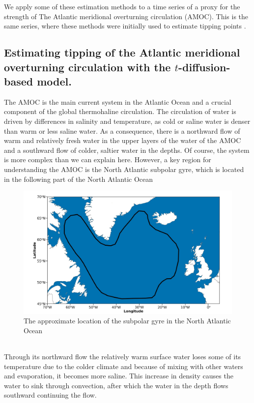 We apply some of these estimation methods to a time series of a proxy for the strength of The Atlantic meridional overturning circulation (AMOC). This is the same series,  where these methods were initially used to estimate tipping points \cite{Ditlevsen2023}.
\subsection{Estimating tipping of the Atlantic meridional overturning circulation with the \texorpdfstring{$t$}{t}-diffusion-based model.}
The AMOC is the main current system in the Atlantic Ocean and a crucial component of the global thermohaline circulation. The circulation of water is driven by differences in salinity and temperature, as cold or saline water is denser than warm or less saline water. As a consequence, there is a northward flow of warm and relatively fresh water in the upper layers of the water of the AMOC and a southward flow of colder, saltier water in the depths. Of course, the system is more complex than we can explain here. However, a key region for understanding the AMOC is the North Atlantic subpolar gyre, which is located in the following part of the North Atlantic Ocean
\begin{figure}[h!]
    \begin{center}
        \includegraphics[scale = .175]{figures/NorthAtlanticOcean.jpeg}
    \end{center}
    \caption{The approximate location of the subpolar gyre in the North Atlantic Ocean}
    \label{figure:subpolarGyre}
\end{figure}\\
Through its northward flow the relatively warm surface water loses some of its temperature due to the colder climate and because of mixing with other waters and evaporation, it becomes more saline. This increase in density causes the water to sink through convection, after which the water in the depth flows southward continuing the flow. 

